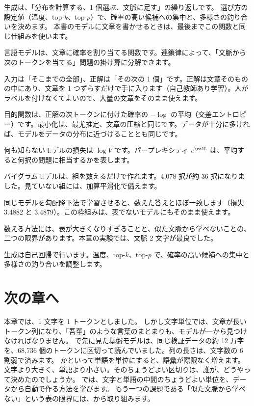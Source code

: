 生成は、「分布を計算する、1 個選ぶ、文脈に足す」の繰り返しです。
選び方の設定値（温度、top-$k$、top-$p$）で、確率の高い候補への集中と、多様さの釣り合いを決めます。
本書のモデルに文章を書かせるときは、最後までこの関数と同じ仕組みを使います。

\begin{summary}
\item 言語モデルは、文章に確率を割り当てる関数です。連鎖律によって、「文脈から次のトークンを当てる」問題の掛け算に分解できます。
\item 入力は「そこまでの全部」、正解は「その次の 1 個」です。正解は文章そのものの中にあり、文章を 1 つずらすだけで手に入ります（自己教師あり学習）。人がラベルを付けなくてよいので、大量の文章をそのまま使えます。
\item 目的関数は、正解の次トークンに付けた確率の $-\log$ の平均（交差エントロピー）です。最小化は、最尤推定、文章の圧縮と同じです。データが十分に多ければ、モデルをデータの分布に近づけることとも同じです。
\item 何も知らないモデルの損失は $\log V$ です。パープレキシティ $e^{\calL}$ は、平均すると何択の問題に相当するかを表します。
\item バイグラムモデルは、組を数えるだけで作れます。4,078 択が約 36 択になりました。見ていない組には、加算平滑化で備えます。
\item 同じモデルを勾配降下法で学習させると、数えた答えとほぼ一致します（損失 3.4882 と 3.4879）。この枠組みは、表でないモデルにもそのまま使えます。
\item 数える方法には、表が大きくなりすぎることと、似た文脈から学べないことの、二つの限界があります。本章の実験では、文脈 2 文字が最良でした。
\item 生成は自己回帰で行います。温度、top-$k$、top-$p$ で、確率の高い候補への集中と多様さの釣り合いを調整します。
\end{summary}

\section*{次の章へ}

本章では、1 文字を 1 トークンとしました。
しかし文字単位では、文章が長いトークン列になり、「吾輩」のような言葉のまとまりも、モデルが一から見つけなければなりません。
で先に見た基盤モデルは、同じ検証データの約 12 万字を、68,736 個のトークンに区切って読んでいました。列の長さは、文字数の 6 割弱で済みます。
かといって単語を単位にすると、語彙が際限なく増えます。
文字より大きく、単語より小さい。そのちょうどよい区切りは、誰が、どうやって決めたのでしょうか。
では、文字と単語の中間のちょうどよい単位を、データから自動で作る方法を学びます。
もう一つの課題である「似た文脈から学べない」という表の限界には、から取り組みます。

